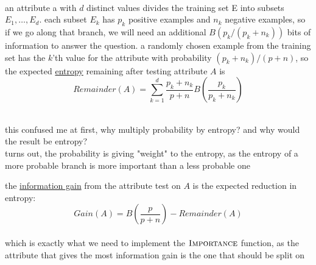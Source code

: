 \documentclass[a4paper,12pt]{article}
\begin{document}
\\

an attribute a with \(d\) distinct values divides the training set E into subsets \(E_1,\dots,E_d\). each subset \(E_k\) has \(p_k\) positive examples and \(n_k\) negative examples, so if we go along that branch, we will need an additional \(B(p_k/(p_k+n_k))\) bits of information to answer the question. a randomly chosen example from the training set has the \(k\)'th value for the attribute with probability \((p_k+n_k)/(p+n)\), so the expected \href{20230227001825-entropy.org}{entropy} remaining after testing attribute \(A\) is\\
\[
Remainder(A) = \sum_{k=1}^{d} \frac{p_k+n_k}{p+n}B\left(\frac{p_k}{p_k+n_k}\right)
\]\\
\begin{note}
this confused me at first, why multiply probability by entropy? and why would the result be entropy?\\
turns out, the probability is giving "weight" to the entropy, as the entropy of a more probable branch is more important than a less probable one\\
\end{note}
the \href{20230313145907-information_gain.org}{information gain} from the attribute test on \(A\) is the expected reduction in entropy:\\
\[
Gain(A) = B\left(\frac{p}{p+n}\right) - Remainder(A)
\]\\
which is exactly what we need to implement the \(\textsc{Importance}\) function, as the attribute that gives the most information gain is the one that should be split on\\
\end{document}
